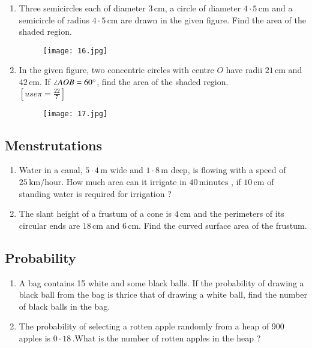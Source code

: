 \documentclass[12pt,-letter paper]{article}
\providecommand{\sbrak}[1]{\ensuremath{{}\left[#1\right]}}
\begin{document}
\begin{enumerate}                                        
\item Three semicircles each of diameter $3 \,\mathrm{cm}$, a circle of diameter $4\cdot5\,\mathrm{cm}$ and a semicircle of radius $4\cdot5\,\mathrm{cm}$ are drawn in the given figure. Find the area of the shaded region.
\begin{figure}[H]                                     
\centering                                          
\texttt{[image: 16.jpg]}  
\caption{}
\end{figure}  
\item In the given figure, two concentric circles with centre $O$ have radii $21 \,\mathrm{cm}$ and $42 \,\mathrm{cm}$. If $\angle AOB = 60{\degree}$, find the area of the shaded region.\\
	\sbrak{use 	\pi = \frac{22}{7}}
\begin{figure}[H]      
\centering                                               
\texttt{[image: 17.jpg]}   
\caption{}
\end{figure}
\end{enumerate}
\begin{center}
\section*{Menstrutations}
\end{center}
\begin{enumerate}
    \item Water in a canal, $5\cdot4\,\mathrm{m}$ wide and $1\cdot8\,\mathrm{m}$ deep, is flowing with a speed of $25\,\mathrm{km/hour}$. How much area can it irrigate in $40\,\mathrm{minutes}$ , if $10\,\mathrm{cm}$ of standing water is required for irrigation ?
\item The slant height of a frustum of a cone is $4 \,\mathrm{cm}$ and the perimeters of its circular ends are $18 \,\mathrm{cm}$ and $6 \,\mathrm{cm}$. Find the curved surface area of the frustum.
\end{enumerate}
\begin{center}
\section*{Probability}
\end{center}
\begin{enumerate}
\item A bag contains 15 white and some black balls. If the probability of 
drawing a black ball from the bag is thrice that of drawing a white ball, 
find the number of black balls in the bag.
\item The probability of selecting a rotten apple randomly from a heap of 900 apples is $0\cdot18\,\mathrm{}$.What is the number of rotten apples in the heap ?
\end{enumerate}
\end{document}
